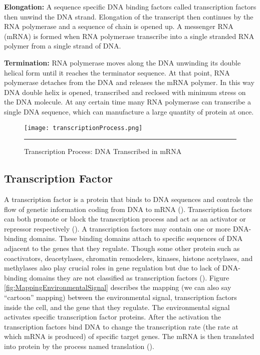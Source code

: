 \textbf{Elongation:} A sequence specific DNA binding factors called transcription factors then unwind 
the DNA strand. Elongation of the transcript then continues by the RNA polymerase and a 
sequence of chain is opened up. A messenger RNA (mRNA) is formed when RNA polymerase transcribe 
into a single stranded RNA polymer from a single strand of DNA.

\textbf{Termination:} RNA polymerase moves along the DNA unwinding its double helical form until it 
reaches the terminator sequence. At that point, RNA polymerase detaches from the DNA and 
releases the mRNA polymer. In this way DNA double helix is opened, transcribed and reclosed 
with minimum stress on the DNA molecule. At any certain time many RNA polymerase can transcribe 
a single DNA sequence, which can manufacture a large quantity of protein at once. 

\begin{figure}%
	\centering
		\texttt{[image: transcriptionProcess.png]}
		\rule{35em}{0.5pt}
	\caption{Transcription Process: DNA Transcribed in mRNA}
	\label{fig:transcriptionProcess}
\end{figure}

\subsection{Transcription Factor}
A transcription factor is a protein that binds to DNA sequences and controls the flow of genetic 
information coding from DNA to mRNA (\cite{karin:1990, Latchman:1997}). Transcription 
factors can both promote or block the transcription process and act as an activator 
or repressor respectively (\cite{Lee:2000, Nikolov:1997, Roeder:1996}). 
A transcription factors may contain one or more DNA-binding domains. These binding domains 
attach to specific sequences of DNA adjacent to the genes that they regulate. Though 
some other protein such as coactivators, deacetylases, chromatin remodelers, kinases, histone 
acetylases, and methylases also play crucial roles in gene regulation but due to lack 
of DNA-binding domains they are not classified as transcription factors 
(\cite{Mitchell:1989, Ptashne:1997, Brivanlou:2002}). 
Figure \ref{fig:MappingEnvironmentalSignal} describes the mapping (we can also say ``cartoon'' mapping) 
between the environmental signal, transcription factors 
inside the cell, and the gene that they regulate. The environmental signal activates 
specific transcription factor proteins. After the activation the transcription factors 
bind DNA to change the transcription rate (the rate at which mRNA is produced) of 
specific target genes. The mRNA is then translated into protein by the process named translation
(\cite{Alon:2006}). 

